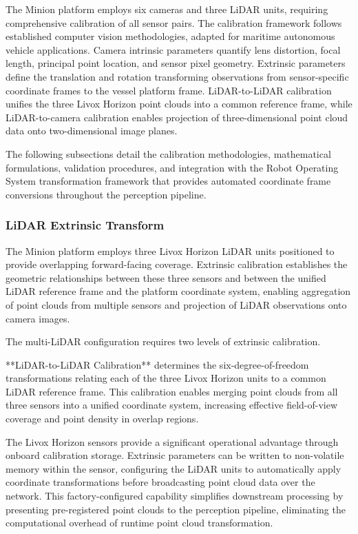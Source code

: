 The Minion platform employs six cameras and three LiDAR units, requiring comprehensive calibration of all sensor pairs.
The calibration framework follows established computer vision methodologies, adapted for maritime autonomous vehicle applications.
Camera intrinsic parameters quantify lens distortion, focal length, principal point location, and sensor pixel geometry.
Extrinsic parameters define the translation and rotation transforming observations from sensor-specific coordinate frames to the vessel platform frame.
LiDAR-to-LiDAR calibration unifies the three Livox Horizon point clouds into a common reference frame, while LiDAR-to-camera calibration enables projection of three-dimensional point cloud data onto two-dimensional image planes.

The following subsections detail the calibration methodologies, mathematical formulations, validation procedures, and integration with the Robot Operating System transformation framework that provides automated coordinate frame conversions throughout the perception pipeline.

\subsubsection{LiDAR Extrinsic Transform} \label{lidar_extrinsic}


The Minion platform employs three Livox Horizon LiDAR units positioned to provide overlapping forward-facing coverage.
Extrinsic calibration establishes the geometric relationships between these three sensors and between the unified LiDAR reference frame and the platform coordinate system, enabling aggregation of point clouds from multiple sensors and projection of LiDAR observations onto camera images.


The multi-LiDAR configuration requires two levels of extrinsic calibration.

**LiDAR-to-LiDAR Calibration** determines the six-degree-of-freedom transformations relating each of the three Livox Horizon units to a common LiDAR reference frame.
This calibration enables merging point clouds from all three sensors into a unified coordinate system, increasing effective field-of-view coverage and point density in overlap regions.

The Livox Horizon sensors provide a significant operational advantage through onboard calibration storage.
Extrinsic parameters can be written to non-volatile memory within the sensor, configuring the LiDAR units to automatically apply coordinate transformations before broadcasting point cloud data over the network.
This factory-configured capability simplifies downstream processing by presenting pre-registered point clouds to the perception pipeline, eliminating the computational overhead of runtime point cloud transformation.


